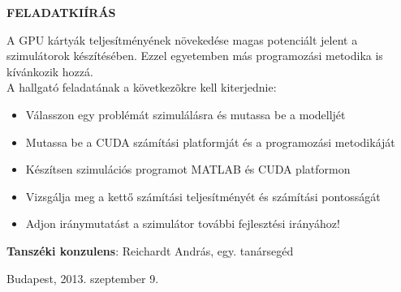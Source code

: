 \clearpage
\begin{center}
\large
\textbf{FELADATKIÍRÁS}\\
\end{center}

\noindent A GPU kártyák teljesítményének növekedése magas potenciált jelent a 
szimulátorok készítésében.
Ezzel egyetemben más programozási metodika is kívánkozik hozzá.\\

\noindent A hallgató feladatának a következõkre kell kiterjednie:
\begin{itemize}
\item Válasszon egy problémát szimulálásra és mutassa be a modelljét
\item Mutassa be a CUDA számítási platformját és a programozási metodikáját
\item Készítsen szimulációs programot MATLAB és CUDA platformon
\item Vizsgálja meg a kettő számítási teljesítményét és számítási pontosságát
\item Adjon iránymutatást a szimulátor további fejlesztési irányához!
\end{itemize}

\begin{flushleft}
\vspace*{1cm}
\textbf{Tanszéki konzulens}: Reichardt András, egy. tanársegéd
\end{flushleft}

\begin{flushleft}
\vspace*{1cm}
Budapest, 2013. szeptember 9.
\end{flushleft}
